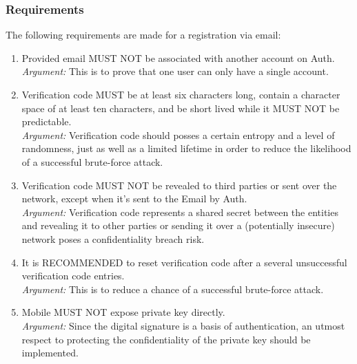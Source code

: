             \subsubsection{Requirements}
            The following requirements are made for a registration via email:
            \begin{enumerate}
                  \item Provided email MUST NOT be associated with another account on Auth.\\
                  \textit{Argument:} This is to prove that one user can only have a single account.

                  \item Verification code MUST be at least six characters long, contain a character space of at least ten 
                        characters, and be short lived while it MUST NOT be predictable.\\     
                  \textit{Argument:} Verification code should posses a certain entropy and a level of randomness, 
                  just as well as a limited lifetime in order to reduce the likelihood of a 
                  successful brute-force attack.

                  \item Verification code MUST NOT be revealed to third parties or sent over the network, except when
                        it's sent to the Email by Auth.\\        
                  \textit{Argument:} Verification code represents a shared secret between the entities and revealing 
                  it to other parties or sending it over a (potentially insecure) network poses 
                  a confidentiality breach risk. 

                  \item It is RECOMMENDED to reset verification code after a several unsuccessful verification 
                        code entries.\\        
                  \textit{Argument:} This is to reduce a chance of a successful brute-force attack.

                  \item Mobile MUST NOT expose private key directly.\\
                  \textit{Argument:} Since the digital signature is a basis of authentication, an utmost respect to 
                  protecting the confidentiality of the private key should be implemented.


\end{enumerate}
